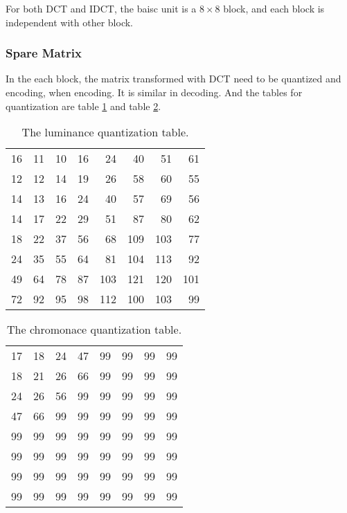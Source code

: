 \documentclass{article}
\begin{document}
For both DCT and IDCT, the baisc unit is a $8 \times 8$ block, and each block is independent with other block.

\subsubsection{Spare Matrix}
\label{sec:hpeg:inside:sparematrix}

In the each block, the matrix transformed with DCT need to be quantized and encoding, when encoding.
It is similar in decoding. And the tables for quantization are table \ref{tab:luminacequantization} and
table \ref{tab:chromonacequantization}.

\begin{table}
    \centering
    \caption{The luminance quantization table.}
    \begin{tabular}{rrrrrrrr}
        \hline
        16 & 11 & 10 & 16 & 24 & 40 & 51 & 61 \\ 
        12 & 12 & 14 & 19 & 26 & 58 & 60 & 55 \\ 
        14 & 13 & 16 & 24 & 40 & 57 & 69 & 56 \\ 
        14 & 17 & 22 & 29 & 51 & 87 & 80 & 62 \\ 
        18 & 22 & 37 & 56 & 68 & 109 & 103 & 77 \\ 
        24 & 35 & 55 & 64 & 81 & 104 & 113 & 92 \\ 
        49 & 64 & 78 & 87 & 103 & 121 & 120 & 101 \\ 
        72 & 92 & 95 & 98 & 112 & 100 & 103 & 99 \\
        \hline
    \end{tabular}
    \label{tab:luminacequantization}
\end{table}

\begin{table}
    \centering
    \caption{The chromonace quantization table.}
    \begin{tabular}{rrrrrrrr}
        \hline
        17 & 18 & 24 & 47 & 99 & 99 & 99 & 99 \\ 
        18 & 21 & 26 & 66 & 99 & 99 & 99 & 99 \\ 
        24 & 26 & 56 & 99 & 99 & 99 & 99 & 99 \\ 
        47 & 66 & 99 & 99 & 99 & 99 & 99 & 99 \\ 
        99 & 99 & 99 & 99 & 99 & 99 & 99 & 99 \\ 
        99 & 99 & 99 & 99 & 99 & 99 & 99 & 99 \\ 
        99 & 99 & 99 & 99 & 99 & 99 & 99 & 99 \\ 
        99 & 99 & 99 & 99 & 99 & 99 & 99 & 99 \\
        \hline
    \end{tabular} 
    \label{tab:chromonacequantization}
\end{table}
\end{document}

